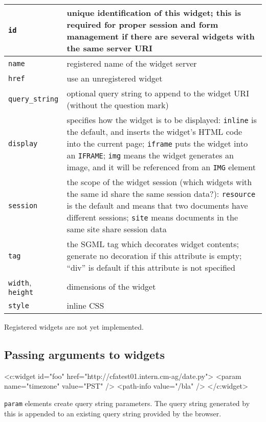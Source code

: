 \documentclass[a4paper,12pt]{article}
\begin{document}
\begin{tabular}{|l|p{8cm}|}
\hline
\texttt{id} & unique identification of this widget; this is required
for proper session and form management if there are several widgets
with the same server URI \\
\hline
\texttt{name} & registered name of the widget server \\
\hline
\texttt{href} & use an unregistered widget \\
\hline
\texttt{query\_string} & optional query string to append to the widget
URI (without the question mark) \\
\hline
\texttt{display} & specifies how the widget is to be displayed:
\texttt{inline} is the default, and inserts the widget's HTML code
into the current page; \texttt{iframe} puts the widget into an
\texttt{IFRAME}; \texttt{img} means the widget generates an image, and
it will be referenced from an \texttt{IMG} element \\
\hline
\texttt{session} & the scope of the widget session (which widgets with
the same id share the same session data?): \texttt{resource} is the
default and means that two documents have different sessions;
\texttt{site} means documents in the same site share session data \\
\hline

\texttt{tag} & the SGML tag which decorates widget contents; generate
no decoration if this attribute is empty; ``div'' is default if this
attribute is not specified \\

\hline
\texttt{width}, \texttt{height} & dimensions of the widget \\
\hline
\texttt{style} & inline CSS \\
\hline
\end{tabular}

Registered widgets are not yet implemented.

\subsection{Passing arguments to widgets}

\begin{verbatim*}
<c:widget id="foo" href="http://cfatest01.intern.cm-ag/date.py">
  <param name="timezone" value="PST" />
  <path-info value="/bla" />
</c:widget>
\end{verbatim*}

\texttt{param} elements create query string parameters.  The query
string generated by this is appended to an existing query string
provided by the browser.
\end{document}
